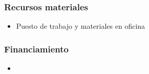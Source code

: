 \documentclass{proyectotesis}
\begin{document}
\subsubsection*{Recursos materiales}

\begin{itemize}
\item Puesto de trabajo y materiales en oficina

\nocite{*}
\end{itemize}
\subsubsection*{Financiamiento}
\begin{itemize}
\item
\end{itemize}

%
%
\end{document}
